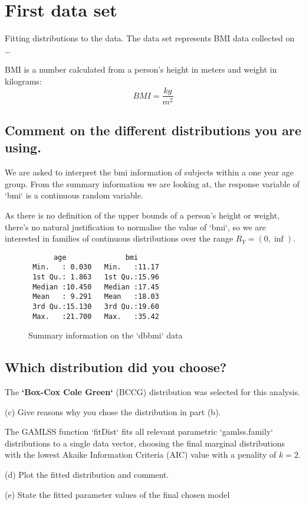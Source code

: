 \section{First data set}

Fitting distributions to the data.  The data set represents BMI data collected on \ldots

BMI is a number calculated from a person's height in meters and weight in kilograms:
\begin{equation}
  BMI = \frac{kg}{m^2}
\end{equation}

\subsection{Comment on the different distributions you are using.}

We are asked to interpret the bmi information of subjects within a one year
age group.  From the summary information we are looking at, the response
variable of `bmi` is a continuous random variable.

As there is no definition of the upper bounds of a person's height or weight,
there's no natural justification to normalise the value of `bmi`, so we are
interested in families of continuous distributions over the range $R_Y = (0, \inf)$.

\begin{figure}[!ht]
\begin{verbatim}
      age              bmi       
 Min.   : 0.030   Min.   :11.17  
 1st Qu.: 1.863   1st Qu.:15.96  
 Median :10.450   Median :17.45  
 Mean   : 9.291   Mean   :18.03  
 3rd Qu.:15.130   3rd Qu.:19.60  
 Max.   :21.700   Max.   :35.42  
\end{verbatim}
\caption {Summary information on the `dbbmi` data}
\end{figure}


\subsection{Which distribution did you choose?}

The \textbf{`Box-Cox Cole Green`} (BCCG) distribution was selected for this analysis.

(c) Give reasons why you chose the distribution in part (b).

The GAMLSS function `fitDist` fits all relevant parametric `gamlss.family` distributions
to a single data vector, choosing the final marginal distributions with the lowest
Akaike Information Criteria (AIC) value with a penality of $k=2$.

(d) Plot the fitted distribution and comment.

(e) State the fitted parameter values of the final chosen model


